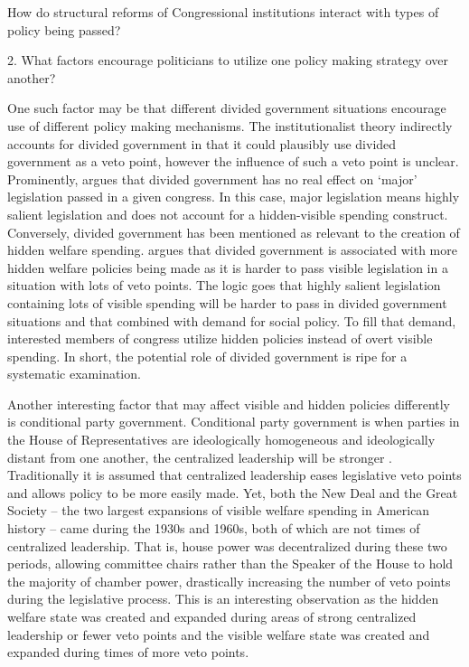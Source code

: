 \documentclass[12pt]{article}
\begin{document}
How do structural reforms of Congressional institutions interact with types of policy being passed?

2. What factors encourage politicians to utilize one policy making strategy over another?

One such factor may be that different divided government situations encourage use of different policy making mechanisms.  The institutionalist theory indirectly accounts for divided government in that it could plausibly use divided government as a veto point, however the influence of such a veto point is unclear. Prominently, \cite{mayhew1990} argues that divided government has no real effect on `major' legislation passed in a given congress. In this case, major legislation means highly salient legislation and does not account for a hidden-visible spending construct. Conversely, divided government has been mentioned as relevant to the creation of hidden welfare spending. \citet[Ch. 4]{howard2008} argues that divided government is associated with more hidden welfare policies being made as it is harder to pass visible legislation in a situation with lots of veto points. The logic goes that highly salient legislation containing lots of visible spending will be harder to pass in divided government situations and that combined with demand for social policy. To fill that demand, interested members of congress utilize hidden policies instead of overt visible spending. In short, the potential role of divided government is ripe for a systematic examination.

Another interesting factor that may affect visible and hidden policies differently is conditional party government. Conditional party government is when parties in the House of Representatives are ideologically homogeneous and ideologically distant from one another, the centralized leadership will be stronger \cite{rohde1991}. Traditionally it is assumed that centralized leadership eases legislative veto points and allows policy to be more easily made. Yet, both the New Deal and the Great Society -- the two largest expansions of visible welfare spending in American history -- came during the 1930s and 1960s, both of which are not times of centralized leadership. That is, house power was decentralized during these two periods, allowing committee chairs rather than the Speaker of the House to hold the majority of chamber power, drastically increasing the number of veto points during the legislative process. This is an interesting observation as the hidden welfare state was created and expanded during areas of strong centralized leadership or fewer veto points and the visible welfare state was created and expanded during times of more veto points.
\end{document}
